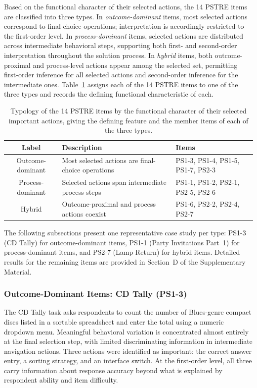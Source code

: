 Based on the functional character of their selected actions, the 14 PSTRE items are classified into three types. In \textit{outcome-dominant} items, most selected actions correspond to final-choice operations; interpretation is accordingly restricted to the first-order level. In \textit{process-dominant} items, selected actions are distributed across intermediate behavioral steps, supporting both first- and second-order interpretation throughout the solution process. In \textit{hybrid} items, both outcome-proximal and process-level actions appear among the selected set, permitting first-order inference for all selected actions and second-order inference for the intermediate ones. Table~\ref{tab:item_types} assigns each of the 14 PSTRE items to one of the three types and records the defining functional characteristic of each.

\begin{table}[htb]
\centering
{\small
\begin{tabular}{cll}
\toprule
Label & Description & Items \\
\midrule
Outcome-dominant & Most selected actions are final-choice operations & PS1-3, PS1-4, PS1-5, PS1-7, PS2-3 \\
Process-dominant & Selected actions span intermediate process steps & PS1-1, PS1-2, PS2-1, PS2-5, PS2-6 \\
Hybrid           & Outcome-proximal and process actions coexist     & PS1-6, PS2-2, PS2-4, PS2-7 \\
\bottomrule
\end{tabular}
}
\caption{Typology of the 14 PSTRE items by the functional character of their selected important actions, giving the defining feature and the member items of each of the three types.}
\label{tab:item_types}
\end{table}

The following subsections present one representative case study per type: PS1-3 (CD Tally) for outcome-dominant items, PS1-1 (Party Invitations Part~1) for process-dominant items, and PS2-7 (Lamp Return) for hybrid items. Detailed results for the remaining items are provided in Section~D of the Supplementary Material.

\subsubsection{Outcome-Dominant Items: CD Tally (PS1-3)}

The CD Tally task asks respondents to count the number of Blues-genre compact discs listed in a sortable spreadsheet and enter the total using a numeric dropdown menu. Meaningful behavioral variation is concentrated almost entirely at the final selection step, with limited discriminating information in intermediate navigation actions. Three actions were identified as important: the correct answer entry, a sorting strategy, and an interface switch. At the first-order level, all three carry information about response accuracy beyond what is explained by respondent ability and item difficulty. 

